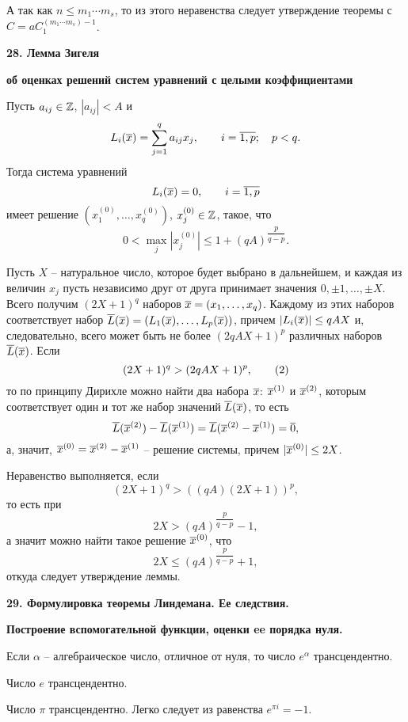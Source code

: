 А так как $n \le m_1 \cdots m_s$, то из этого неравенства следует утверждение
теоремы с $C=a C_1^{(m_1 \cdots m_s)-1}$.

\enddemo

\vskip 5mm
\centerline{\bf {28. Лемма Зигеля}  }
\centerline{\bf {об оценках решений систем уравнений с целыми коэффициентами}}
\vskip 5mm

 Пусть $a_{ij} \in \Bbb Z$, $|a_{ij}| < A$  и
$$
L_i(\overline x)= \sum_{j=1}^q a_{ij}x_j, \qquad  i= \overline {1,p}; \quad p<q.
$$
Тогда система уравнений
$$
L_i(\overline x)=0, \qquad i= \overline {1,p}
$$
имеет решение $(x_1^{(0)}, \dots, x_q^{(0)})$, $x_j^{(0)} \in \Bbb Z$,
такое, что
$$
0< \max_j |x_j^{(0)}| \le 1 + (qA)^{\dfrac p{q-p}}.
$$
\endproclaim

 Пусть $X$  -- натуральное число, которое будет выбрано
в дальнейшем, и каждая из величин $x_j$
пусть независимо друг от друга принимает
значения $0, \pm 1, \dots, \pm X.$ Всего получим $(2X+1)^q$ наборов
$\overline x=(x_1, \dots, x_q)$. Каждому из этих наборов соответствует набор
$\overline L(\overline x) = (L_1(\overline x ), \dots, L_p ( \overline x ))$, причем
$|L_i(\overline x )| \leq qAX$  и, следовательно, всего может быть не более
$(2qAX+1)^p$ различных наборов   $\overline L ( \overline x )$.   Если
$$
(2X+1)^q > (2qAX+1)^p,
\tag 2
$$
то по принципу Дирихле можно найти два  набора  $\overline x$: $\overline x^{(1)}$
и $\overline x^{(2)}$, которым соответствует
один и тот же набор значений $\overline L (\overline x)$, то есть
$$
\overline L (\overline x^{(2)}) - \overline L (\overline x^{(1)}) = \overline L (\overline x^{(2)}- \overline x^{(1)})
= \overline 0,
$$
а, значит, $\overline x^{(0)} = \overline x^{(2)}- \overline x^{(1)}  $
-- решение системы, причем $|\overline x^{(0)}| \leq 2X$.

Неравенство    выполняется, если
$$
(2X+1)^q > ((qA)(2X+1))^p,
$$
то есть при
$$
2X > (qA)^{\dfrac p{q-p}} -1,
$$
а значит можно найти такое решение $\overline x^{(0)}$, что
$$
2X \le (qA)^{\dfrac p{q-p}} +1,
$$
откуда следует утверждение леммы.
\enddemo

\vskip 5mm
\centerline{\bf {29. Формулировка теоремы Линдемана. Ее следствия.}  }
\centerline{\bf {Построение вспомогательной функции, оценки ee порядка нуля.}}
\vskip 5mm

 Если  $\alpha$ --   алгебраическое
число, отличное от нуля, то число $e^{\alpha}$ трансцендентно.
\endproclaim

   Число $e$ трансцендентно.
\endproclaim

 Число $\pi$ трансцендентно.
\endproclaim
Легко следует из равенства $e^{\pi i}=-1$.

